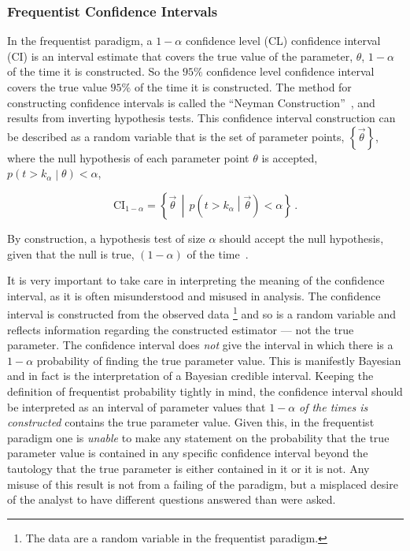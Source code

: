 \subsubsection{Frequentist Confidence Intervals}

In the frequentist paradigm, a $1-\alpha$ confidence level (CL) confidence interval (CI) is an interval estimate that covers the true value of the parameter, $\theta$, $1-\alpha$ of the time it is constructed.
So the $95\%$ confidence level confidence interval covers the true value $95\%$ of the time it is constructed.
The method for constructing confidence intervals is called the ``Neyman Construction''~\cite{Neyman:1937uhy}, and results from inverting hypothesis tests.
This confidence interval construction can be described as a random variable that is the set of parameter points, $\left\{\vec{\theta}\right\}$, where the null hypothesis of each parameter point $\theta$ is accepted, $p\left(t > k_{\alpha}\middle| \theta\right) < \alpha$,

\begin{equation}
 \mathrm{CI}_{1-\alpha} = \left\{\vec{\theta}\,\middle| \,p\left(t > k_{\alpha}\middle| \vec{\theta}\right) < \alpha\right\}\,.
 \label{eq:confidence_interval}
\end{equation}

By construction, a hypothesis test of size $\alpha$ should accept the null hypothesis, given that the null is true, $(1-\alpha)$ of the time~\cite{Cranmer:2015nia}.

It is very important to take care in interpreting the meaning of the confidence interval, as it is often misunderstood and misused in analysis.
The confidence interval is constructed from the observed data%
\footnote{The data are a random variable in the frequentist paradigm.}
and so is a random variable and reflects information regarding the constructed estimator --- not the true parameter.
The confidence interval does \emph{not} give the interval in which there is a $1-\alpha$ probability of finding the true parameter value.
This is manifestly Bayesian and in fact is the interpretation of a Bayesian credible interval.
Keeping the definition of frequentist probability tightly in mind, the confidence interval should be interpreted as an interval of parameter values that $1-\alpha$ \emph{of the times is constructed} contains the true parameter value.
Given this, in the frequentist paradigm one is \emph{unable} to make any statement on the probability that the true parameter value is contained in any specific confidence interval beyond the tautology that the true parameter is either contained in it or it is not.
Any misuse of this result is not from a failing of the paradigm, but a misplaced desire of the analyst to have different questions answered than were asked.

